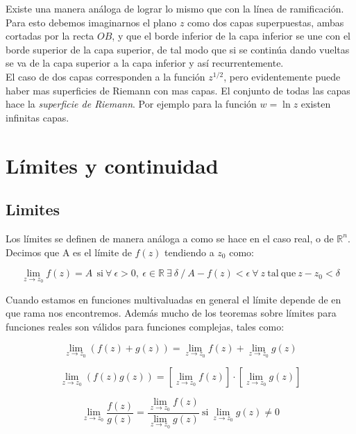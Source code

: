 \documentclass[12pt]{book}
\newcommand{\ccorchetes}[1]{\left[ #1  \right]}
\begin{document}
Existe una manera análoga de lograr lo mismo que con la línea de ramificación. Para esto debemos imaginarnos el plano $z$ como dos capas superpuestas, ambas cortadas por la recta $OB$, y que el borde inferior de la capa inferior se une con el borde superior de la capa superior, de tal modo que si se continúa dando vueltas se va de la capa superior a la capa inferior y así recurrentemente. \\

El caso de dos capas corresponden a la función $z^{1/2}$, pero evidentemente puede haber mas superficies de Riemann con mas capas. El conjunto de todas las capas hace la \textit{superficie de Riemann}. Por ejemplo para la función $w = \ln z$ existen infinitas capas.

\section{Límites y continuidad}

\subsection{Limites}

Los límites se definen de manera análoga a como se hace en el caso real, o de $\mathbb{R}^n$. Decimos que A es el límite de $f(z)$ tendiendo a $z_0$ como:

\begin{equation}
\lim_{z \rightarrow z_0} f(z)  = A  \ \ \mathrm{si} \ \forall \ \epsilon > 0, \ \epsilon \in \mathbb{R} \  \exists \ \delta \ / \ A - f(z) < \epsilon   \ \forall \ z \ \mathrm{tal \ que} \ z-z_0 < \delta
 \end{equation}

Cuando estamos en funciones multivaluadas en general el límite depende de en que rama nos encontremos. Además mucho de los teoremas sobre límites para funciones reales son válidos para funciones complejas, tales como:

\begin{equation}
\lim_{z \rightarrow z_0} (f(z)+g(z)) = \lim_{z \rightarrow z_0} f(z) + \lim_{z \rightarrow z_0} g(z)
\end{equation}

\begin{equation}
\lim_{z \rightarrow z_0} (f(z) g(z)) = \ccorchetes{\lim_{z \rightarrow z_0} f(z)} \cdot \ccorchetes{\lim_{z \rightarrow z_0} g(z) }
\end{equation}

\begin{equation}
\lim_{z \rightarrow z_0}  \dfrac{f(z)}{g(z)} = \dfrac{\lim_{z \rightarrow z_0}  f(z)}{\lim_{z \rightarrow z_0} g(z)} \ \mathrm{si} \ \lim_{z \rightarrow z_0} g(z) \neq 0
\end{equation}
\end{document}
